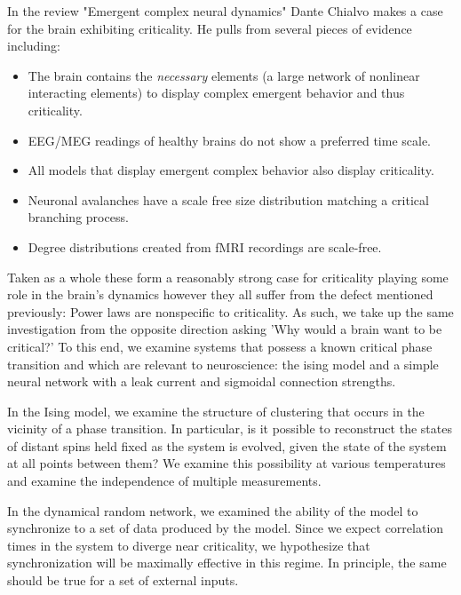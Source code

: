 \documentclass{article} %
\begin{document}
In the review  "Emergent complex neural dynamics\cite{Chialvo2010}" Dante Chialvo
makes a case for the brain exhibiting criticality.  He pulls from several
pieces of evidence including:
\begin{itemize}
\item The brain contains the \emph{necessary} elements (a large network of
nonlinear interacting elements) to display complex emergent behavior and thus
criticality.
\item EEG/MEG readings of healthy brains do not show a preferred time scale.
\item All models that display emergent complex behavior also display
criticality. 
\item Neuronal avalanches have a scale free size distribution matching a
critical branching process.
\item Degree distributions created from fMRI recordings are scale-free.
\end{itemize}
Taken as a whole these form a reasonably strong case for criticality playing 
some role in the brain's dynamics however they all suffer from the defect
mentioned previously: Power laws are nonspecific to criticality.  As such, we
take up the same investigation from the opposite direction asking 'Why would a
brain want to be critical?'  To this end, we examine systems that possess a
known critical phase transition and which are relevant to neuroscience: the
ising model and a simple neural network with a leak current and sigmoidal
connection strengths.

In the Ising model, we examine the structure of clustering that occurs in the
vicinity of a phase transition.  In particular, is it possible to reconstruct
the states of distant spins held fixed as the system is evolved, given the state
of the system at all points between them?  We examine this possibility at
various temperatures and examine the independence of multiple measurements.

In the dynamical random network, we examined the ability of the model to synchronize to a set of data produced by the model.  Since we expect correlation times in the system to diverge near criticality, we hypothesize that synchronization will be maximally effective in this regime.  In principle, the same should be true for a set of external inputs.

\end{document}
